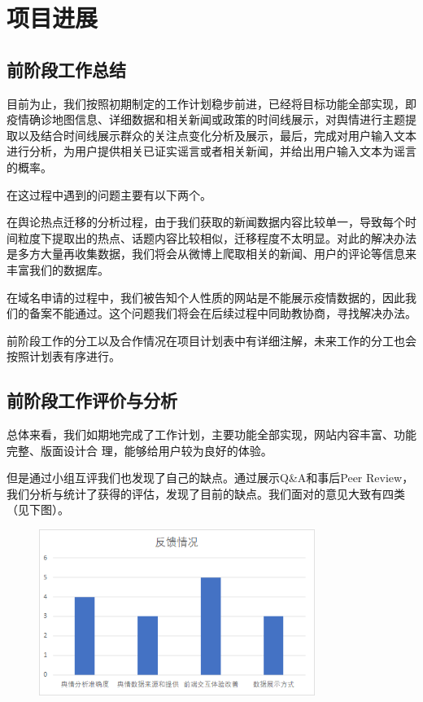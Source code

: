 \documentclass{article}
\begin{document}
\section{项目进展}
\subsection{前阶段工作总结}
目前为止，我们按照初期制定的工作计划稳步前进，已经将目标功能全部实现，即疫情确诊地图信息、详细数据和相关新闻或政策的时间线展示，对舆情进行主题提取以及结合时间线展示群众的关注点变化分析及展示，最后，完成对用户输入文本进行分析，为用户提供相关已证实谣言或者相关新闻，并给出用户输入文本为谣言的概率。

在这过程中遇到的问题主要有以下两个。

在舆论热点迁移的分析过程，由于我们获取的新闻数据内容比较单一，导致每个时间粒度下提取出的热点、话题内容比较相似，迁移程度不太明显。对此的解决办法是多方大量再收集数据，我们将会从微博上爬取相关的新闻、用户的评论等信息来丰富我们的数据库。

在域名申请的过程中，我们被告知个人性质的网站是不能展示疫情数据的，因此我们的备案不能通过。这个问题我们将会在后续过程中同助教协商，寻找解决办法。


前阶段工作的分工以及合作情况在项目计划表中有详细注解，未来工作的分工也会按照计划表有序进行。


\subsection{前阶段工作评价与分析}

总体来看，我们如期地完成了工作计划，主要功能全部实现，网站内容丰富、功能完整、版面设计合 理，能够给用户较为良好的体验。 

但是通过小组互评我们也发现了自己的缺点。通过展示Q\&A和事后Peer Review，我们分析与统计了获得的评估，发现了目前的缺点。我们面对的意见大致有四类（见下图）。

\begin{figure}[H]
\centering
\includegraphics[width=0.8\textwidth]{pic4.jpg}
\end{figure}
\end{document}

